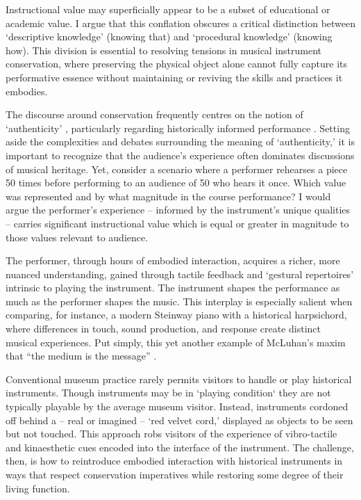 Instructional value may superficially appear to be a subset of educational or academic value. I argue that this conflation obscures a critical distinction between `descriptive knowledge' (knowing that) and `procedural knowledge' (knowing how). This division is essential to resolving tensions in musical instrument conservation, where preserving the physical object alone cannot fully capture its performative essence without maintaining or reviving the skills and practices it embodies.

The discourse around conservation frequently centres on the notion of `authenticity' \cite{pine_museums_2007, laurenson_authenticity_2006}, particularly regarding historically informed performance \cite{davies_authenticity_2001}. Setting aside the complexities and debates surrounding the meaning of `authenticity,' it is important to recognize that the audience's experience often dominates discussions of musical heritage. Yet, consider a scenario where a performer rehearses a piece 50 times before performing to an audience of 50 who hears it once. Which value was represented and by what magnitude in the course performance? I would argue the performer’s experience -- informed by the instrument’s unique qualities -- carries significant instructional value which is equal or greater in magnitude to those values relevant to audience. 

The performer, through hours of embodied interaction, acquires a richer, more nuanced understanding, gained through tactile feedback and `gestural repertoires' \cite[][]{levinson_music_1990} intrinsic to playing the instrument. The instrument shapes the performance as much as the performer shapes the music. This interplay is especially salient when comparing, for instance, a modern Steinway piano with a historical harpsichord, where differences in touch, sound production, and response create distinct musical experiences. Put simply, this yet another example of McLuhan’s maxim that ``the medium is the message'' \cite[][]{mcluhan_understanding_1964}.

Conventional museum practice rarely permits visitors to handle or play historical instruments. Though instruments may be in `playing condition` they are not typically playable by the average museum visitor. Instead, instruments cordoned off behind a -- real or imagined -- `red velvet cord,' \cite{mcalpine_sampling_2014} displayed as objects to be seen but not touched. This approach robs visitors of the experience of vibro-tactile and kinaesthetic cues encoded into the interface of the instrument. The challenge, then, is how to reintroduce embodied interaction with historical instruments in ways that respect conservation imperatives while restoring some degree of their living function.

